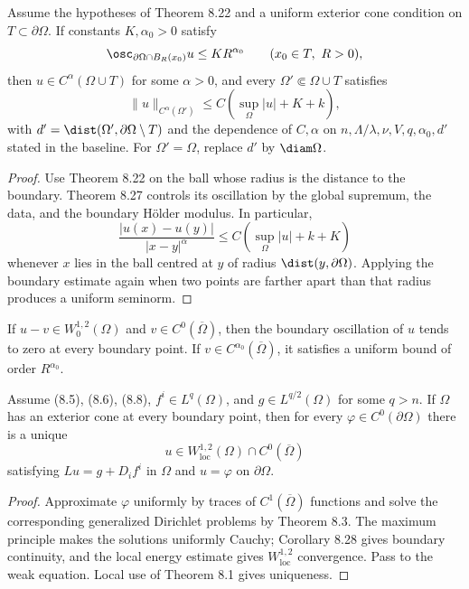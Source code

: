 \begin{theorem}
\label{gt-thm-8-29-boundary-holder}
Assume the hypotheses of Theorem 8.22 and a uniform exterior cone condition on
$T\subset\partial\Omega$. If constants $K,\alpha_0>0$ satisfy
\[
\osc_{\partial\Omega\cap B_R(x_0)}u\leq KR^{\alpha_0}
\qquad(x_0\in T,\ R>0),
\]
then $u\in C^\alpha(\Omega\cup T)$ for some $\alpha>0$, and every
$\Omega'\Subset\Omega\cup T$ satisfies
\begin{equation}
\|u\|_{C^\alpha(\Omega')}
\leq C(\sup_\Omega|u|+K+k),
\tag{8.73}
\end{equation}
with $d'=\dist(\Omega',\partial\Omega\setminus T)$ and the dependence of
$C,\alpha$ on $n,\Lambda/\lambda,\nu,V,q,\alpha_0,d'$ stated in the baseline.
For $\Omega'=\Omega$, replace $d'$ by $\diam\Omega$.
\end{theorem}
\begin{proof}
\sketch Use Theorem 8.22 on the ball whose radius is the distance to the boundary.
Theorem 8.27 controls its oscillation by the global supremum, the data, and the
boundary H\"older modulus. In particular,
\begin{equation}
\tag{8.74}
\frac{|u(x)-u(y)|}{|x-y|^\alpha}
\leq C(\sup_\Omega|u|+k+K)
\end{equation}
whenever $x$ lies in the ball centred at $y$ of radius
$\dist(y,\partial\Omega)$. Applying the boundary estimate again when two points
are farther apart than that radius produces a uniform seminorm.
\end{proof}

\begin{remark}
\label{gt-rem-8-boundary-oscillation-trace}
If $u-v\in W_0^{1,2}(\Omega)$ and $v\in C^0(\overline\Omega)$, then the boundary
oscillation of $u$ tends to zero at every boundary point. If
$v\in C^{\alpha_0}(\overline\Omega)$, it satisfies a uniform bound of order
$R^{\alpha_0}$.
\end{remark}

\begin{theorem}
\label{gt-thm-8-30-continuous-dirichlet-cone}
Assume (8.5), (8.6), (8.8), $f^i\in L^q(\Omega)$, and
$g\in L^{q/2}(\Omega)$ for some $q>n$. If $\Omega$ has an exterior cone at every
boundary point, then for every $\varphi\in C^0(\partial\Omega)$ there is a unique
\[
u\in W^{1,2}_{\mathrm{loc}}(\Omega)\cap C^0(\overline\Omega)
\]
satisfying $Lu=g+D_if^i$ in $\Omega$ and $u=\varphi$ on $\partial\Omega$.
\end{theorem}
\begin{proof}
\sketch Approximate $\varphi$ uniformly by traces of $C^1(\overline\Omega)$
functions and solve the corresponding generalized Dirichlet problems by
Theorem 8.3. The maximum principle makes the solutions uniformly Cauchy;
Corollary 8.28 gives boundary continuity, and the local energy estimate gives
$W^{1,2}_{\mathrm{loc}}$ convergence. Pass to the weak equation. Local use of
Theorem 8.1 gives uniqueness.
\end{proof}

